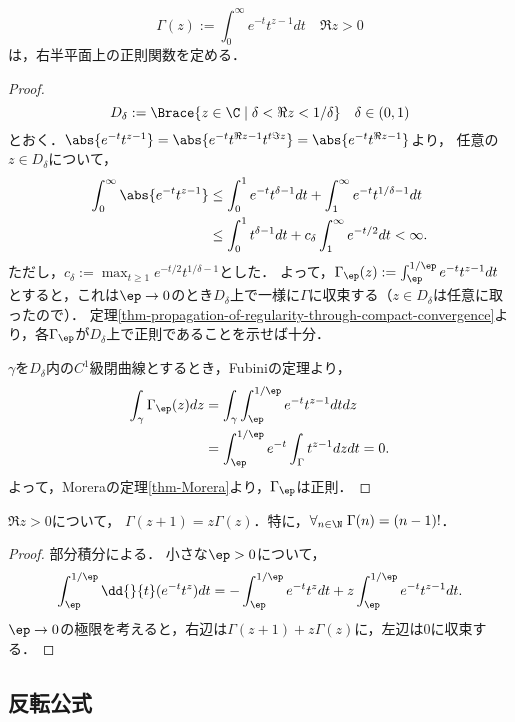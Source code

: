 \documentclass[uplatex, dvipdfmx]{jsreport}
\begin{document}
\begin{definition}
    \[\Gamma(z):=\int^\infty_0e^{-t}t^{z-1}dt\quad\Re z>0\]
    は，右半平面上の正則関数を定める．
\end{definition}
\begin{proof}
    \[D_\delta:=\Brace{z\in\C\mid\delta<\Re z<1/\delta}\quad\delta\in(0,1)\]
    とおく．$\abs{e^{-t}t^{z-1}}=\abs{e^{-t}t^{\Re z-1}t^{t\Im z}}=\abs{e^{-t}t^{\Re z-1}}$より，
    任意の$z\in D_\delta$について，
    \begin{align*}
        \int^\infty_0\abs{e^{-t}t^{z-1}}&\le\int^1_0e^{-t}t^{\delta-1}dt+\int^\infty_1e^{-t}t^{1/\delta-1}dt\\
        &\le\int^1_0t^{\delta-1}dt+c_\delta\int^\infty_1e^{-t/2}dt<\infty.
    \end{align*}
    ただし，$c_\delta:=\max_{t\ge 1}e^{-t/2}t^{1/\delta-1}$とした．
    よって，$\Gamma_\ep(z):=\int^{1/\ep}_\ep e^{-t}t^{z-1}dt$とすると，これは$\ep\to0$のとき$D_\delta$上で一様に$\Gamma$に収束する（$z\in D_\delta$は任意に取ったので）．
    定理\ref{thm-propagation-of-regularity-through-compact-convergence}より，各$\Gamma_\ep$が$D_\delta$上で正則であることを示せば十分．

    $\gamma$を$D_\delta$内の$C^1$級閉曲線とするとき，Fubiniの定理より，
    \begin{align*}
        \int_\gamma\Gamma_\ep(z)dz&=\int_\gamma\int^{1/\ep}_\ep e^{-t}t^{z-1}dtdz\\
        &=\int^{1/\ep}_{\ep}e^{-t}\int_\Gamma t^{z-1}dzdt=0.
    \end{align*}
    よって，Moreraの定理\ref{thm-Morera}より，$\Gamma_\ep$は正則．
\end{proof}

\begin{theorem}
    $\Re z>0$について，
    $\Gamma(z+1)=z\Gamma(z)$．特に，$\forall_{n\in\N}\;\Gamma(n)=(n-1)!$．
\end{theorem}
\begin{proof}
    部分積分による．
    小さな$\ep>0$について，
    \[\int^{1/\ep}_\ep\dd{}{t}(e^{-t}t^z)dt=-\int^{1/\ep}_\ep e^{-t}t^zdt+z\int^{1/\ep}_\ep e^{-t}t^{z-1}dt.\]
    $\ep\to0$の極限を考えると，右辺は$\Gamma(z+1)+z\Gamma(z)$に，左辺は$0$に収束する．
\end{proof}

\begin{discussion}[複素平面全体への延長]
    
\end{discussion}

\subsection{反転公式}
\end{document}
